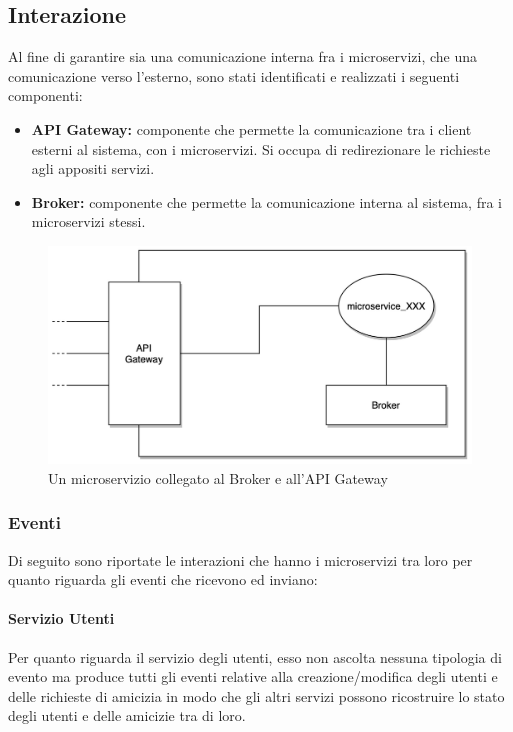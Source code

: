 \subsection{Interazione}


Al fine di garantire sia una comunicazione interna fra i microservizi, che una comunicazione verso l'esterno, sono stati identificati e realizzati i seguenti componenti:

\begin{itemize}
    \item \textbf{API Gateway:} componente che permette la comunicazione tra i client esterni al sistema, con i microservizi. Si occupa di redirezionare le richieste agli appositi servizi.

    \item \textbf{Broker:} componente che permette la comunicazione interna al sistema, fra i microservizi stessi.
\end{itemize}

\begin{figure}[htbp]
    \centering
    \includegraphics[width=\textwidth]{sections/03-design/img/gateway-broker-microservice.jpg}
    \caption{Un microservizio collegato al Broker e all'API Gateway}
    \label{fig:gateway-broker-microservice}
\end{figure}

%
%
%
\subsubsection{Eventi}
  
Di seguito sono riportate le interazioni che hanno i microservizi tra loro per quanto riguarda gli eventi che ricevono ed inviano:

%
%
%
\paragraph{Servizio Utenti}
Per quanto riguarda il servizio degli utenti, esso non ascolta nessuna tipologia di evento ma produce tutti gli eventi relative alla creazione/modifica degli utenti e delle richieste di amicizia in modo che gli altri servizi possono ricostruire lo stato degli utenti e delle amicizie tra di loro.

